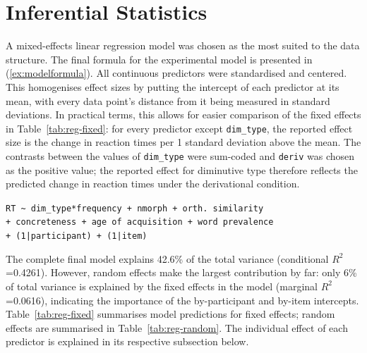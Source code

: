 \section{Inferential Statistics} \label{sec:inf_stats}
A mixed-effects linear regression model was chosen as the most suited to the data structure. The final formula for the experimental model is presented in (\ref{ex:modelformula}). All continuous predictors were standardised and centered. This homogenises effect sizes by putting the intercept of each predictor at its mean, with every data point's distance from it being measured in standard deviations. In practical terms, this allows for easier comparison of the fixed effects in Table~\ref{tab:reg-fixed}: for every predictor except \texttt{dim\_type}, the reported effect size is the change in reaction times per 1 standard deviation above the mean. The contrasts between the values of \texttt{dim\_type} were sum-coded and \texttt{deriv} was chosen as the positive value; the reported effect for diminutive type therefore reflects the predicted change in reaction times under the derivational condition.

\begin{exe}
\ex \label{ex:modelformula}
\texttt{RT \textasciitilde ~dim\_type*frequency + nmorph + orth. similarity \\ 
+ concreteness + age of acquisition + word prevalence \\
+ (1|participant) + (1|item)}
\end{exe}

The complete final model explains 42.6\% of the total variance (conditional $R^2$=0.4261). However, random effects make the largest contribution by far: only 6\% of total variance is explained by the fixed effects in the model (marginal $R^2$=0.0616), indicating the importance of the by-participant and by-item intercepts. Table~\ref{tab:reg-fixed} summarises model predictions for fixed effects; random effects are summarised in Table~\ref{tab:reg-random}. The individual effect of each predictor is explained in its respective subsection below.


